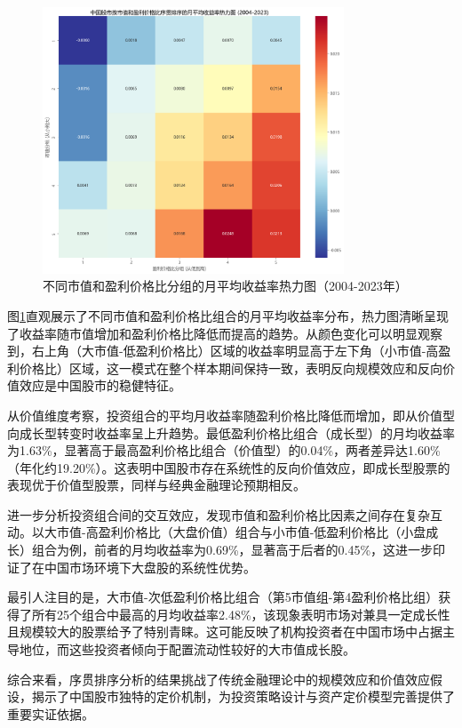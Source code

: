 \documentclass[12pt, a4paper]{article}
\begin{document}
\begin{figure}[htbp]
\centering
\includegraphics[width=0.8\textwidth]{./img/市值分组平均收益率.png}
\caption{不同市值和盈利价格比分组的月平均收益率热力图（2004-2023年）}
\label{fig:sequential_heatmap}
\end{figure}

图\ref{fig:sequential_heatmap}直观展示了不同市值和盈利价格比组合的月平均收益率分布，热力图清晰呈现了收益率随市值增加和盈利价格比降低而提高的趋势。从颜色变化可以明显观察到，右上角（大市值-低盈利价格比）区域的收益率明显高于左下角（小市值-高盈利价格比）区域，这一模式在整个样本期间保持一致，表明反向规模效应和反向价值效应是中国股市的稳健特征。

从价值维度考察，投资组合的平均月收益率随盈利价格比降低而增加，即从价值型向成长型转变时收益率呈上升趋势。最低盈利价格比组合（成长型）的月均收益率为1.63\%，显著高于最高盈利价格比组合（价值型）的0.04\%，两者差异达1.60\%（年化约19.20\%）。这表明中国股市存在系统性的反向价值效应，即成长型股票的表现优于价值型股票，同样与经典金融理论预期相反。

进一步分析投资组合间的交互效应，发现市值和盈利价格比因素之间存在复杂互动。以大市值-高盈利价格比（大盘价值）组合与小市值-低盈利价格比（小盘成长）组合为例，前者的月均收益率为0.69\%，显著高于后者的0.45\%，这进一步印证了在中国市场环境下大盘股的系统性优势。

最引人注目的是，大市值-次低盈利价格比组合（第5市值组-第4盈利价格比组）获得了所有25个组合中最高的月均收益率2.48\%，该现象表明市场对兼具一定成长性且规模较大的股票给予了特别青睐。这可能反映了机构投资者在中国市场中占据主导地位，而这些投资者倾向于配置流动性较好的大市值成长股。

综合来看，序贯排序分析的结果挑战了传统金融理论中的规模效应和价值效应假设，揭示了中国股市独特的定价机制，为投资策略设计与资产定价模型完善提供了重要实证依据。
\end{document}
